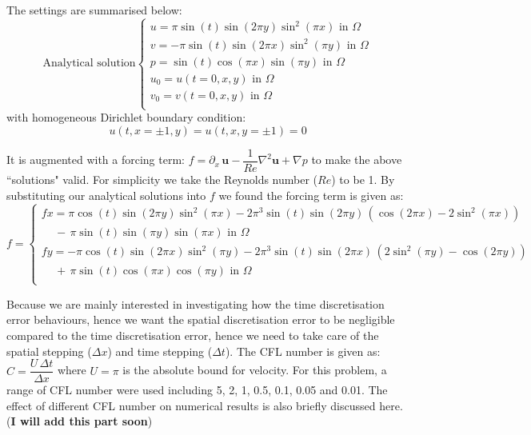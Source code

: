 The settings are summarised below:
\begin{equation}
\text{Analytical solution}
\begin{cases}
u = \pi\sin(t)\sin(2\pi y)\sin^2(\pi x) \text{   in $\Omega$} \\
v = - \pi \sin(t)\sin(2\pi x)\sin^2(\pi y) \text{   in $\Omega$} \\
p = \sin(t)\cos(\pi x)\sin(\pi y)  \text{   in $\Omega$}  \\
u_0 = u(t=0,x,y)  \text{   in $\Omega$}  \\
v_0 = v(t=0,x,y)  \text{   in $\Omega$}  \\
\end{cases}
\end{equation}
with homogeneous Dirichlet boundary condition:
\begin{equation*}
u(t, x=\pm 1, y) = u(t, x,y= \pm 1) = 0
\end{equation*}

It is augmented with a forcing term: $f = \partial_x\,\textbf{u} - \dfrac{1}{Re}\nabla^2 \textbf{u} + \nabla p$ to make the above ``solutions" valid. For simplicity we take the Reynolds number ($Re$) to be 1. By substituting our analytical solutions into $f$ we found the forcing term is given as:
\begin{equation}
f = 
\begin{cases}
fx = \pi\cos(t)\sin(2\pi y)\sin^2(\pi x) -  2 \pi^3\sin(t)\sin(2\pi y)\,(\cos(2\pi x) - 2\sin^2(\pi x)) \\
\,\,\,\,\,\,\,- \, \pi\sin(t)\sin(\pi y)\sin(\pi x) \text{   in $\Omega$} \\
fy = - \pi\cos(t)\sin(2\pi x)\sin^2(\pi y) - 2\pi^3\sin(t)\sin(2\pi x)\,(2\sin^2(\pi y) - \cos(2\pi y)) \\
\,\,\,\,\,\,\,+ \, \pi\sin(t)\cos(\pi x)\cos(\pi y)  \text{   in $\Omega$}  \\
\end{cases}
\end{equation}

Because we are mainly interested in investigating how the time discretisation error behaviours, hence we want the spatial discretisation error to be negligible compared to the time discretisation error, hence we need to take care of the spatial stepping ($\Delta x$) and time stepping ($\Delta t$). The CFL number is given as: $C = \dfrac{U\,\Delta t}{\Delta x}$ where $U = \pi$ is the absolute bound for velocity. For this problem, a range of CFL number were used including 5, 2, 1, 0.5, 0.1, 0.05 and 0.01. The effect of different CFL number on numerical results is also briefly discussed here. (\textbf{I will add this part soon})\\


